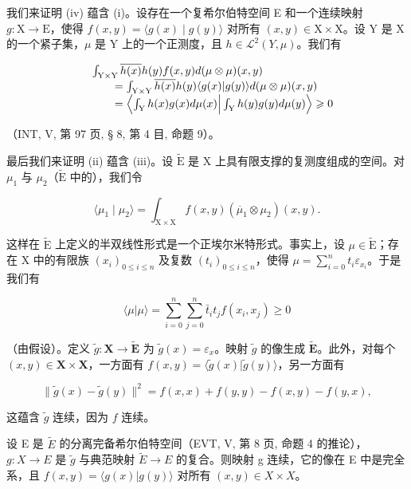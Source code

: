 我们来证明 (iv) 蕴含 (i)。设存在一个复希尔伯特空间 E 和一个连续映射 \(g \colon \mathrm{X} \to \mathrm{E}\)，使得 \(f(x, y) = \langle g(x) \mid g(y) \rangle\) 对所有 \((x, y) \in \mathrm{X} \times \mathrm{X}\)。设 Y 是 X 的一个紧子集，\(\mu\) 是 Y 上的一个正测度，且 \(h \in \mathcal{L}^{2}(Y, \mu)\)。我们有

\[
\begin{array}{r l} & {\int_ {\mathrm{Y} \times \mathrm{Y}} \overline {{h (x)}} h (y) f (x, y) d (\mu \otimes \mu) (x, y)} \\ & {\qquad = \int_ {\mathrm{Y} \times \mathrm{Y}} \overline {{h (x)}} h (y) \langle g (x) | g (y) \rangle d (\mu \otimes \mu) (x, y)} \\ & {\qquad = \left\langle \int_ {\mathrm{Y}} h (x) g (x) d \mu (x) \Big | \int_ {\mathrm{Y}} h (y) g (y) d \mu (y) \right\rangle \geqslant 0} \end{array}
\]

（INT, V, 第 97 页, § 8, 第 4 目, 命题 9）。

最后我们来证明 (ii) 蕴含 (iii)。设 \(\widetilde{\mathrm{E}}\) 是 X 上具有限支撑的复测度组成的空间。对 \(\mu_{1}\) 与 \(\mu_{2}\)（\(\widetilde{\mathrm{E}}\) 中的），我们令

\[
\langle \mu_ {1} \mid \mu_ {2} \rangle = \int_ {\mathrm{X} \times \mathrm{X}} f (x, y) (\overline {{\mu}} _ {1} \otimes \mu_ {2}) (x, y).
\]

这样在 \(\widetilde{\mathrm{E}}\) 上定义的半双线性形式是一个正埃尔米特形式。事实上，设 \(\mu \in \widetilde{\mathrm{E}}\)；存在 X 中的有限族 \((x_{i})_{0\leqslant i\leqslant n}\) 及复数 \((t_i)_{0\leqslant i\leqslant n}\)，使得 \(\mu = \sum_{i=0}^{n} t_i \varepsilon_{x_i}\)。于是我们有

\[
\langle \mu | \mu \rangle = \sum_ {i = 0} ^ {n} \sum_ {j = 0} ^ {n} \bar {t} _ {i} t _ {j} f (x _ {i}, x _ {j}) \geqslant 0
\]

（由假设）。定义 \(\widetilde{g}\colon\mathbf{X}\to\widetilde{\mathbf{E}}\) 为 \(\widetilde{g}(x)=\varepsilon_{x}\)。映射 \(\widetilde{g}\) 的像生成 \(\widetilde{\mathbf{E}}\)。此外，对每个 \((x,y)\in\mathbf{X}\times\mathbf{X}\)，一方面有 \(f(x,y)=\langle\widetilde{g}(x)|\widetilde{g}(y)\rangle\)，另一方面有

\[
\| \widetilde {g} (x) - \widetilde {g} (y) \| ^ {2} = f (x, x) + f (y, y) - f (x, y) - f (y, x),
\]

这蕴含 \(\widetilde{g}\) 连续，因为 \(f\) 连续。

设 E 是 \(\widetilde{E}\) 的分离完备希尔伯特空间（EVT, V, 第 8 页, 命题 4 的推论），\(g\colon X \to E\) 是 \(\widetilde{g}\) 与典范映射 \(\widetilde{E} \to E\) 的复合。则映射 g 连续，它的像在 E 中是完全系，且 \(f(x,y) = \langle g(x) | g(y) \rangle\) 对所有 \((x,y) \in X \times X\)。

